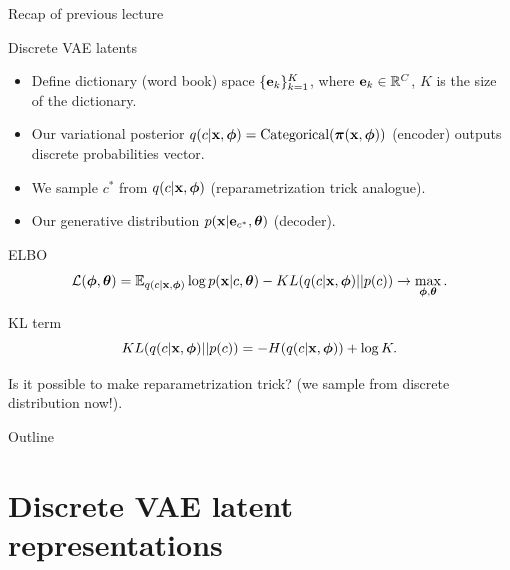 \begin{frame}{Recap of previous lecture}
	\begin{block}{Discrete VAE latents}
		\begin{itemize}
			\item Define dictionary (word book) space $\{\mathbf{e}_k\}_{k=1}^K$, where $\mathbf{e}_k \in \mathbb{R}^C$, $K$ is the size of the dictionary.
			\item Our variational posterior $q(c | \mathbf{x}, \boldsymbol{\phi}) = \text{Categorical}(\boldsymbol{\pi}(\mathbf{x}, \boldsymbol{\phi}))$ (encoder) outputs discrete probabilities vector.
			\item We sample $c^*$ from $q(c | \mathbf{x}, \boldsymbol{\phi})$ (reparametrization trick analogue).
			\item Our generative distribution $p(\mathbf{x} | \mathbf{e}_{c^*}, \boldsymbol{\theta})$ (decoder).
		\end{itemize}
	\end{block}
	\vspace{-0.3cm}
	\begin{block}{ELBO}
		\vspace{-0.7cm}
		\[
		\mathcal{L} (\boldsymbol{\phi}, \boldsymbol{\theta})  = \mathbb{E}_{q(c | \mathbf{x}, \boldsymbol{\phi})} \log p(\mathbf{x} | c, \boldsymbol{\theta}) - KL(q(c| \mathbf{x}, \boldsymbol{\phi}) || p(c)) \rightarrow \max_{\boldsymbol{\phi}, \boldsymbol{\theta}}.
		\]
		\vspace{-0.7cm}
	\end{block}
	\begin{block}{KL term}
		\vspace{-0.4cm}
		\[
		KL(q(c| \mathbf{x}, \boldsymbol{\phi}) || p(c)) = - H(q(c | \mathbf{x}, \boldsymbol{\phi})) + \log K. 
		\]
	\end{block}
	Is it possible to make reparametrization trick? (we sample from discrete distribution now!).
\end{frame}
\begin{frame}{Outline}
	\tableofcontents
\end{frame}
\section{Discrete VAE latent representations}
